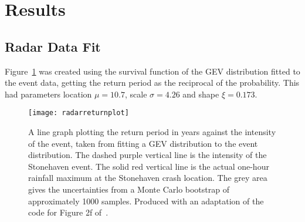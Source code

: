 \section{Results}\label{sec:results}

\begin{comment}
This section should detail the obtained results in a clear,
easy-to-follow manner. It is important to make clear what are original
results and what are repeats of previous calculations or computations.
Remember that long tables of numbers are just as boring to read as
they are to type-in!

Use graphs to present your results wherever practicable.

Results or computations should be presented with uncertainties
(errors), both statistical and systematic where applicable.

Be selective in what you include: half a dozen \emph{e.g.}~tables that
contain wrong data you collected while you forgot to switch on the
computer are not relevant and may mask the correct results.
\end{comment}

\subsection{Radar Data Fit}\label{subsec:radardatafit}

Figure~\ref{fig:radarreturnplot} was created using the survival function of the GEV distribution fitted to the event data,
    getting the return period as the reciprocal of the probability.
This had parameters location $\mu = 10.7$, scale $\sigma = 4.26$ and shape $\xi = 0.173$.

\begin{figure}[H]
    \centering
    \texttt{[image: radarreturnplot]}
    \caption[A line graph plotting the return period in years against the intensity of the event.]{
        A line graph plotting the return period in years against the intensity of the event,
        taken from fitting a GEV distribution to the event distribution.
    The dashed purple vertical line is the intensity of the Stonehaven event.
    The solid red vertical line is the actual one-hour rainfall maximum at the Stonehaven crash location.
    The grey area gives the uncertainties from a Monte Carlo bootstrap of approximately 1000 samples.
    Produced with an adaptation of the code for Figure 2f of~\cite{Tett_Soon}.}
    \label{fig:radarreturnplot}
\end{figure}

